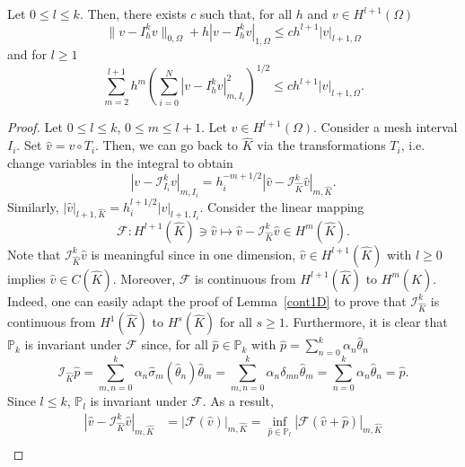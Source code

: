 \begin{lemma}\label{interpolationerrPk}
    Let $0 \le l \le k$. Then, there exists $c$ such that, for all $h$ and $v \in H^{l+1}(\Omega)$
    \begin{equation*}
\|v - I_h^k v\|_{0,\Omega} + h |v - I_h^k v|_{1,\Omega} \le c h^{l+1} |v|_{l+1,\Omega}
\end{equation*}
    and for $l \ge 1$
    \begin{equation*}
\sum_{m=2}^{l+1} h^m \left(\sum_{i=0}^N |v - I_h^k v|_{m,I_i}^2\right)^{1/2} \le c h^{l+1} |v|_{l+1,\Omega}.
\end{equation*}

\begin{proof}
    Let $0 \le l \le k$, $0 \le m \le l+1$. Let $v \in H^{l+1}(\Omega)$.
    Consider a mesh interval $I_i$. Set $\hat{v} = v \circ T_i$. Then, we can go back to $\hat{K}$ via the transformations $T_i$, i.e. change variables in the integral to obtain
    \begin{equation*}
|v - \mathcal{I}_{I_i}^k v|_{m,I_i} = h_i^{-m+1/2} |\hat{v} - \mathcal{I}_{\hat{K}}^k \hat{v}|_{m,\hat{K}}.
\end{equation*}
    Similarly, $|\hat{v}|_{l+1,\hat{K}} = h_i^{l+1/2} |v|_{l+1,I_i}$. 
    Consider the linear mapping
    \begin{equation*}
\mathcal{F}: H^{l+1}(\hat{K}) \ni \hat{v} \mapsto \hat{v} - \mathcal{I}_{\hat{K}}^k \hat{v} \in H^m(\hat{K}).
\end{equation*}
    Note that $\mathcal{I}_{\hat{K}}^k \hat{v}$ is meaningful since in one dimension, $\hat{v} \in H^{l+1}(\hat{K})$ with $l \ge 0$ implies $\hat{v} \in C(\hat{K})$. Moreover, $\mathcal{F}$ is continuous from $H^{l+1}(\hat{K})$ to $H^m(\hat{K})$. Indeed, one can easily adapt the proof of Lemma~\ref{cont1D} to prove that $\mathcal{I}_{\hat{K}}^k$ is continuous from $H^1(\hat{K})$ to $H^s(\hat{K})$ for all $s \ge 1$. Furthermore, it is clear that $\mathbb{P}_k$ is invariant under $\mathcal{F}$ since, for all $\hat{p} \in \mathbb{P}_k$ with $\hat{p} = \sum_{n=0}^k \alpha_n \hat{\theta}_n$
    \begin{equation*}
\mathcal{I}_{\hat{K}} \hat{p} = \sum_{m,n=0}^k \alpha_n \hat{\sigma}_m(\hat{\theta}_n) \hat{\theta}_m = \sum_{m,n=0}^k \alpha_n \delta_{mn} \hat{\theta}_m = \sum_{n=0}^k \alpha_n \hat{\theta}_n = \hat{p}.
\end{equation*}
    Since $l \le k$, $\mathbb{P}_l$ is invariant under $\mathcal{F}$. As a result,
    \begin{align*}
        |\hat{v} - \mathcal{I}_{\hat{K}}^k \hat{v}|_{m,\hat{K}} &= |\mathcal{F}(\hat{v})|_{m,\hat{K}} = \inf_{\hat{p} \in \mathbb{P}_l} |\mathcal{F}(\hat{v} + \hat{p})|_{m,\hat{K}} \\

\end{align*}
\end{proof}
\end{lemma}
